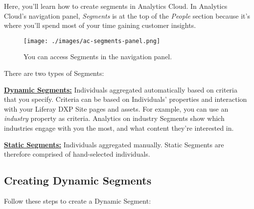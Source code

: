 Here, you'll learn how to create segments in Analytics Cloud. In
Analytics Cloud's navigation panel, \emph{Segments} is at the top of the
\emph{People} section because it's where you'll spend most of your time
gaining customer insights.

\begin{figure}
\centering
\texttt{[image: ./images/ac-segments-panel.png]}
\caption{You can access Segments in the navigation panel.}
\end{figure}

There are two types of Segments:

\hyperref[creating-dynamic-segments]{\textbf{Dynamic Segments:}}
Individuals aggregated automatically based on criteria that you specify.
Criteria can be based on Individuals' properties and interaction with
your Liferay DXP Site pages and assets. For example, you can use an
\emph{industry} property as criteria. Analytics on industry Segments
show which industries engage with you the most, and what content they're
interested in.

\hyperref[creating-static-segments]{\textbf{Static Segments:}}
Individuals aggregated manually. Static Segments are therefore comprised
of hand-selected individuals.

\subsection{Creating Dynamic Segments}\label{creating-dynamic-segments}

Follow these steps to create a Dynamic Segment:

